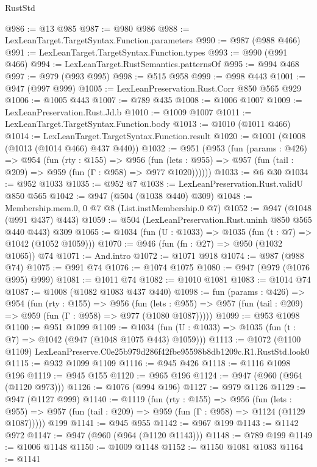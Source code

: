 \begin{lexlean}{RustStd}
\begin{coremodule}
@986 := @13 @985
@987 := @980 @986
@988 := LexLeanTarget.TargetSyntax.Function.parameters
@990 := @987 (@988 @466)
@991 := LexLeanTarget.TargetSyntax.Function.types
@993 := @990 (@991 @466)
@994 := LexLeanTarget.RustSemantics.patternsOf
@995 := @994 @468
@997 := @979 (@993 @995)
@998 := @515 @958
@999 := @998 @443
@1001 := @947 (@997 @999)
@1005 := LexLeanPreservation.Rust.Corr @850 @565 @929
@1006 := @1005 @443
@1007 := @789 @435
@1008 := @1006 @1007
@1009 := LexLeanPreservation.Rust.Jd.b
@1010 := @1009 @1007
@1011 := LexLeanTarget.TargetSyntax.Function.body
@1013 := @1010 (@1011 @466)
@1014 := LexLeanTarget.TargetSyntax.Function.result
@1020 := @1001 (@1008 (@1013 (@1014 @466) @437 @440))
@1032 := @951
    (@953
      (fun (params : @426) =>
      @954
        (fun (rty : @155) =>
        @956
          (fun (lets : @955) => @957 (fun (tail : @209) => @959 (fun (Γ : @958) => @977 @1020))))))
@1033 := @6 @30
@1034 := @952 @1033
@1035 := @952 @7
@1038 := LexLeanPreservation.Rust.validU @850 @565
@1042 := @947 (@504 (@1038 @440) @309)
@1048 := Membership.mem.{0, 0} @7 @8 (List.instMembership.{0} @7)
@1052 := @947 (@1048 (@991 @437) @443)
@1059 := @504 (LexLeanPreservation.Rust.uninh @850 @565 @440 @443) @309
@1065 := @1034 (fun (U : @1033) => @1035 (fun (t : @7) => @1042 (@1052 @1059)))
@1070 := @946 (fun (fn : @27) => @950 (@1032 @1065)) @74
@1071 := And.intro
@1072 := @1071 @918
@1074 := @987 (@988 @74)
@1075 := @991 @74
@1076 := @1074 @1075
@1080 := @947 (@979 (@1076 @995) @999)
@1081 := @1011 @74
@1082 := @1010 @1081
@1083 := @1014 @74
@1087 := @1008 (@1082 @1083 @437 @440)
@1098 := fun (params : @426) =>
  @954
    (fun (rty : @155) =>
    @956
      (fun (lets : @955) =>
      @957 (fun (tail : @209) => @959 (fun (Γ : @958) => @977 (@1080 @1087)))))
@1099 := @953 @1098
@1100 := @951 @1099
@1109 := @1034 (fun (U : @1033) => @1035 (fun (t : @7) => @1042 (@947 (@1048 @1075 @443) @1059)))
@1113 := @1072 (@1100 @1109) LexLeanPreserve.C0e25b979d286f42fbe95598b8db1209c.R1.RustStd.look0
@1115 := @932 @1099 @1109
@1116 := @945 @426
@1118 := @1116 @1098 @196
@1119 := @945 @155
@1120 := @965 @196
@1124 := @947 (@960 (@964 (@1120 @973)))
@1126 := @1076 (@994 @196)
@1127 := @979 @1126
@1129 := @947 (@1127 @999)
@1140 := @1119
    (fun (rty : @155) =>
    @956
      (fun (lets : @955) =>
      @957 (fun (tail : @209) => @959 (fun (Γ : @958) => @1124 (@1129 @1087)))))
    @199
@1141 := @945 @955
@1142 := @967 @199
@1143 := @1142 @972
@1147 := @947 (@960 (@964 (@1120 @1143)))
@1148 := @789 @199
@1149 := @1006 @1148
@1150 := @1009 @1148
@1152 := @1150 @1081 @1083
@1164 := @1141

\end{coremodule}
\end{lexlean}
